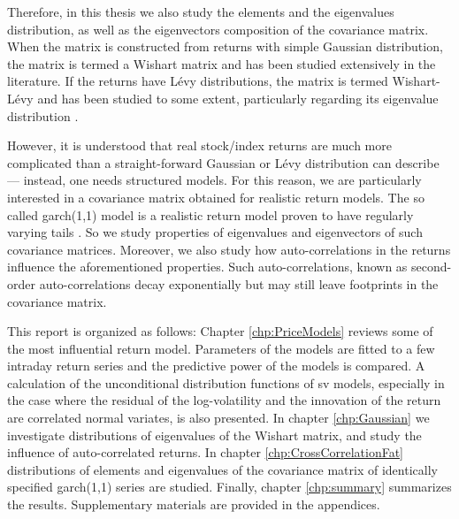 \documentclass{report}
\begin{document}
Therefore, in this thesis we also study the elements and the
eigenvalues distribution, as well as the eigenvectors composition of
the covariance matrix. When the matrix is constructed from returns
with simple Gaussian distribution, the matrix is termed a Wishart matrix
and has been studied extensively in the literature. If the returns
have L\'evy distributions, the matrix is termed Wishart-L\'evy and has
been studied to some extent, particularly regarding its eigenvalue
distribution \cite{politi2010}.

However, it is understood that real stock/index returns are much more
complicated than a straight-forward Gaussian or L\'evy distribution can
describe --- instead, one needs structured models. For this reason, we
are particularly interested in a covariance matrix obtained for
realistic return models. The so called \gls{garch}(1,1) model is a realistic
return model proven to have regularly varying tails
\cite{mikosch2000}. So we study properties of eigenvalues and
eigenvectors of such covariance matrices. Moreover, we also study how
auto-correlations in the returns influence the aforementioned
properties. Such auto-correlations, known as second-order
auto-correlations decay exponentially but may still leave footprints
in the covariance matrix.

This report is organized as follows: Chapter \ref{chp:PriceModels}
reviews some of the most influential return model. Parameters of the
models are fitted to a few intraday return series and the predictive
power of the models is compared. A calculation of the
unconditional distribution functions of \gls{sv} models,
especially in the case where the residual of the log-volatility
and the innovation of the return are correlated normal variates, is
also presented. In chapter \ref{chp:Gaussian} we investigate
distributions of eigenvalues of the Wishart matrix, and study the
influence of auto-correlated returns. In chapter
\ref{chp:CrossCorrelationFat} distributions of elements and
eigenvalues of the covariance matrix of identically specified
\gls{garch}(1,1) series are studied. Finally, chapter \ref{chp:summary}
summarizes the results. Supplementary materials are provided in the
appendices.



\end{document}
